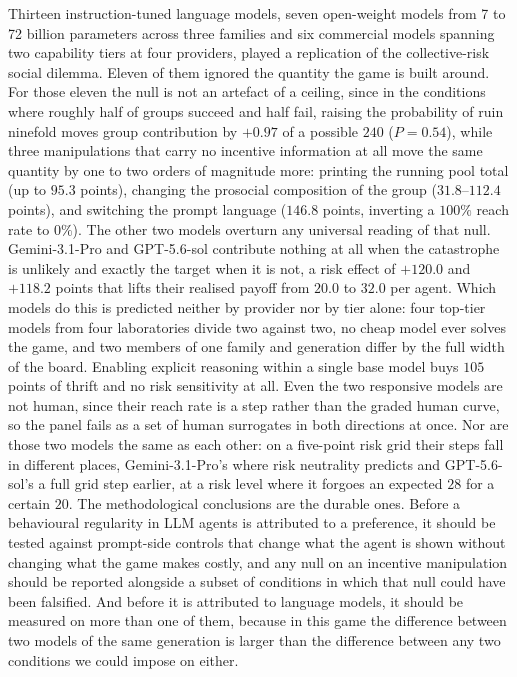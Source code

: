 \documentclass[openacc]{rsproca_new}
\begin{document}
Thirteen instruction-tuned language models, seven open-weight models from 7 to 72 billion parameters across three families and six commercial models spanning two capability tiers at four providers, played a replication of the collective-risk social dilemma. Eleven of them ignored the quantity the game is built around. For those eleven the null is not an artefact of a ceiling, since in the conditions where roughly half of groups succeed and half fail, raising the probability of ruin ninefold moves group contribution by $+0.97$ of a possible $240$ ($P=0.54$), while three manipulations that carry no incentive information at all move the same quantity by one to two orders of magnitude more: printing the running pool total (up to $95.3$ points), changing the prosocial composition of the group ($31.8$--$112.4$ points), and switching the prompt language ($146.8$ points, inverting a $100\%$ reach rate to $0\%$). The other two models overturn any universal reading of that null. Gemini-3.1-Pro and GPT-5.6-sol contribute nothing at all when the catastrophe is unlikely and exactly the target when it is not, a risk effect of $+120.0$ and $+118.2$ points that lifts their realised payoff from $20.0$ to $32.0$ per agent. Which models do this is predicted neither by provider nor by tier alone: four top-tier models from four laboratories divide two against two, no cheap model ever solves the game, and two members of one family and generation differ by the full width of the board. Enabling explicit reasoning within a single base model buys $105$ points of thrift and no risk sensitivity at all. Even the two responsive models are not human, since their reach rate is a step rather than the graded human curve, so the panel fails as a set of human surrogates in both directions at once. Nor are those two models the same as each other: on a five-point risk grid their steps fall in different places, Gemini-3.1-Pro's where risk neutrality predicts and GPT-5.6-sol's a full grid step earlier, at a risk level where it forgoes an expected $28$ for a certain $20$. The methodological conclusions are the durable ones. Before a behavioural regularity in LLM agents is attributed to a preference, it should be tested against prompt-side controls that change what the agent is shown without changing what the game makes costly, and any null on an incentive manipulation should be reported alongside a subset of conditions in which that null could have been falsified. And before it is attributed to language models, it should be measured on more than one of them, because in this game the difference between two models of the same generation is larger than the difference between any two conditions we could impose on either.

\enlargethispage{20pt}

\ethics{}

\dataccess{}

\aucontribute{}

\competing{}

\funding{}

\ack{}


\end{document}
